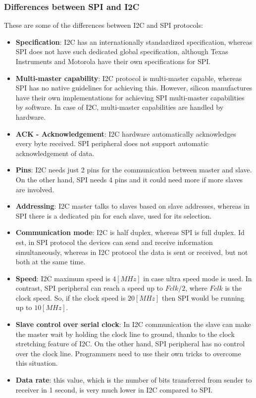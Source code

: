 \documentclass[
a4paper, %
11pt, %
onecolumn, %
openany, %
]{memoir}
\begin{document}
\subsubsection{Differences between SPI and I2C}
These are some of the differences between I2C and SPI protocols:

\begin{itemize}
	\item	\textbf{Specification}: I2C has an internationally standardized specification, whereas SPI does not have such dedicated global specification, although Texas Instruments and Motorola have their own specifications for SPI.
	\item	\textbf{Multi-master capability}: I2C protocol is multi-master capable, whereas SPI has no native guidelines for achieving this. However, silicon manufactures have their own implementations for achieving SPI multi-master capabilities by software. In case of I2C, multi-master capabilities are handled by hardware.
	\item	\textbf{ACK - Acknowledgement}: I2C hardware automatically acknowledges every byte received. SPI peripheral does not support automatic acknowledgement of data.
	\item	\textbf{Pins}: I2C needs just 2 pins for the communication between master and slave. On the other hand, SPI needs 4 pins and it could need more if more slaves are involved.
	\item	\textbf{Addressing}: I2C master talks to slaves based on slave addresses, whereas in SPI there is a dedicated pin for each slave, used for its selection.
	\item	\textbf{Communication mode}: I2C is half duplex, whereas SPI is full duplex. Id est, in SPI protocol the devices can send and receive information simultaneously, whereas in I2C protocol the data is sent or received, but not both at the same time.
	\item	\textbf{Speed}: I2C maximum speed is $4 [MHz]$ in case ultra speed mode is used. In contrast, SPI peripheral can reach a speed up to $Fclk/2$, where $Fclk$ is the clock speed. So, if the clock speed is $20 [MHz]$ then SPI would be running up to $10 [MHz]$.
	\item	\textbf{Slave control over serial clock}: In I2C communication the slave can make the master wait by holding the clock line to ground, thanks to the clock stretching feature of I2C. On the other hand, SPI peripheral has no control over the clock line. Programmers need to use their own tricks to overcome this situation.
	\item	\textbf{Data rate}: this value, which is the number of bits transferred from sender to receiver in 1 second, is very much lower in I2C compared to SPI.
\end{itemize}
\end{document}
